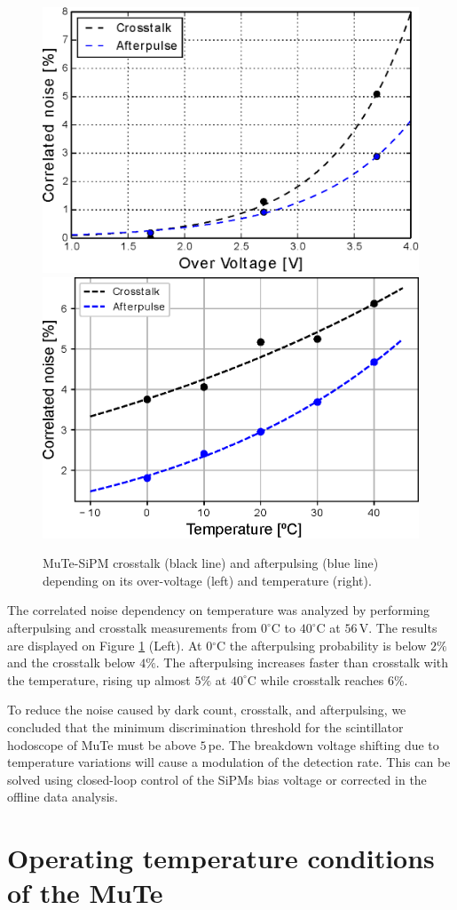 \documentclass[a4paper,11pt]{article}
\begin{document}
\begin{figure}[htbp]
\centering 
\includegraphics[width=.48\textwidth]{Figures/CorrNoise_vs_Ov_1350CS.eps}
\quad
\includegraphics[width=.48\textwidth]{Figures/CorrNoise_vs_T_1350CS.eps}
\caption{MuTe-SiPM crosstalk (black line) and afterpulsing (blue line) depending on its over-voltage (left) and temperature (right).}
\label{fig:after_cross}
\end{figure}

The correlated noise dependency on temperature was analyzed by performing afterpulsing and crosstalk measurements from $0^{\circ}$C to $40^{\circ}$C at $56$\,V. The results are displayed on Figure \ref{fig:after_cross} (Left). At 0$^{\circ}$C the afterpulsing probability is below $2\%$ and the crosstalk below $4\%$. The afterpulsing increases faster than crosstalk with the temperature, rising up almost $5\%$ at $40^{\circ}$C while crosstalk reaches $6\%$.

To reduce the noise caused by dark count, crosstalk, and afterpulsing, we concluded that the minimum discrimination threshold for the scintillator hodoscope of MuTe must be above $5$\,pe. The breakdown voltage shifting due to temperature variations will cause a modulation of the detection rate. This can be solved using closed-loop control of the SiPMs bias voltage or corrected in the offline data analysis.


\section{Operating temperature conditions of the MuTe}
\label{sec:obs}
\end{document}
